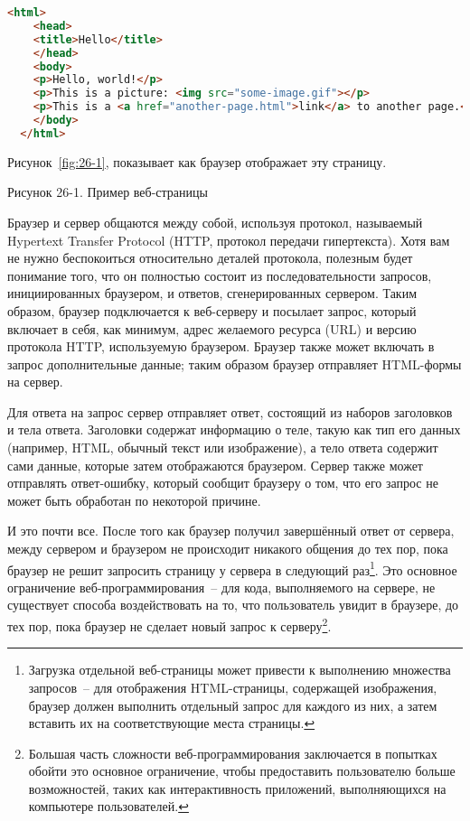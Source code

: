 \begin{lstlisting}[language=HTML]
  <html>
    <head>
    <title>Hello</title>
    </head>
    <body>
    <p>Hello, world!</p>
    <p>This is a picture: <img src="some-image.gif"></p>
    <p>This is a <a href="another-page.html">link</a> to another page.</p>
    </body>
  </html>
\end{lstlisting}

Рисунок~\ref{fig:26-1}, показывает как браузер отображает эту страницу.

Рисунок 26-1. Пример веб-страницы

Браузер и сервер общаются между собой, используя протокол, называемый Hypertext Transfer
Protocol (HTTP, протокол передачи гипертекста). Хотя вам не нужно беспокоиться
относительно деталей протокола, полезным будет понимание того, что он полностью состоит из
последовательности запросов, инициированных браузером, и ответов, сгенерированных
сервером. Таким образом, браузер подключается к веб-серверу и посылает запрос, который
включает в себя, как минимум, адрес желаемого ресурса (URL) и версию протокола HTTP,
используемую браузером. Браузер также может включать в запрос дополнительные данные; таким
образом браузер отправляет HTML-формы на сервер.

Для ответа на запрос сервер отправляет ответ, состоящий из наборов заголовков и тела
ответа. Заголовки содержат информацию о теле, такую как тип его данных (например, HTML,
обычный текст или изображение), а тело ответа содержит сами данные, которые затем
отображаются браузером. Сервер также может отправлять ответ-ошибку, который сообщит
браузеру о том, что его запрос не может быть обработан по некоторой причине.

И это почти все. После того как браузер получил завершённый ответ от сервера, между
сервером и браузером не происходит никакого общения до тех пор, пока браузер не решит
запросить страницу у сервера в следующий раз\footnote{Загрузка отдельной веб-страницы
  может привести к выполнению множества запросов~-- для отображения HTML-страницы,
  содержащей изображения, браузер должен выполнить отдельный запрос для каждого из них, а
  затем вставить их на соответствующие места страницы.}. Это основное ограничение
веб-программирования~-- для кода, выполняемого на сервере, не существует способа
воздействовать на то, что пользователь увидит в браузере, до тех пор, пока браузер не
сделает новый запрос к серверу\footnote{Большая часть сложности веб-программирования
  заключается в попытках обойти это основное ограничение, чтобы предоставить пользователю
  больше возможностей, таких как интерактивность приложений, выполняющихся на компьютере
  пользователей.}.


